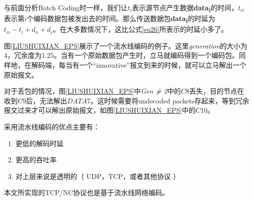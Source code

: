 \par
与前面分析Batch Coding时一样，我们让$t_{i}$表示源节点产生数据\textbf{data}\textbf{\textsubscript{i}}的时间，$t_{ci}$表示第$i$个编码数据包被发出去的时间。那么传送数据包\textbf{data}\textbf{\textsubscript{i}}的时延为$t_{ci} - t_{i}+d_{n}+d_{c}$。在大多数情况下，这比公式\ref{eq26}所表示的时延小多了。
\par
图\ref{LIUSHUIXIAN_EPS}展示了一个流水线编码的例子。这里\emph{generation}的大小为4，冗余度为1.25。当有一个原始数据包产生时，立马就编码得到一个编码包。同样地，在解码端，每当有一个“innovative”报文到来的时候，就可以立马解出一个原始报文。
\par
对于丢包的情况，图\ref{LIUSHUIXIAN_EPS}中\emph{Gen \# 2}中的$C8$丢失，目的节点在收到$C9$后，无法解出$DATA7$。这时候需要将undecoded packets存起来，等到冗余报文过来才可以解出原始报文，如图\ref{LIUSHUIXIAN_EPS}中的$C10$。
\par
采用流水线编码的优点主要有：
\begin{enumerate}[fullwidth,itemindent=2em,label=(\arabic*)]
	\item 更低的解码时延
	\item 更高的吞吐率
	\item 对上层来说是透明的（ UDP，TCP，或者其他协议 ）
\end{enumerate}
\par
本文所实现的TCP/NC协议也是基于流水线网络编码。
%

